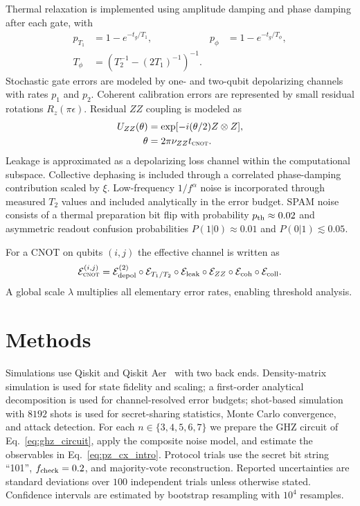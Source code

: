 \documentclass[aip,amsmath,amssymb,reprint,longbibliography]{revtex4-2}
\newcommand{\cnot}{\textsc{cnot}}
\newcommand{\cE}{\mathcal{E}}
\begin{document}
Thermal relaxation is implemented using amplitude damping and phase damping after each gate, with
\begin{equation}
\begin{aligned}
p_{T_1}&=1-e^{-t_g/T_1},&
p_\phi&=1-e^{-t_g/T_\phi},\\
T_\phi&=\left(T_2^{-1}-(2T_1)^{-1}\right)^{-1}.
\end{aligned}
\label{eq:t1t2_rates}
\end{equation}
Stochastic gate errors are modeled by one- and two-qubit depolarizing channels with rates $p_1$ and $p_2$.  Coherent calibration errors are represented by small residual rotations $R_z(\pi\epsilon)$.  Residual $ZZ$ coupling is modeled as
\begin{equation}
\begin{aligned}
U_{ZZ}(\theta)&=\exp[-i(\theta/2)Z\otimes Z],\\
\theta&=2\pi\nu_{ZZ}t_{\cnot}.
\end{aligned}
\label{eq:zz_noise}
\end{equation}
Leakage is approximated as a depolarizing loss channel within the computational subspace.  Collective dephasing is included through a correlated phase-damping contribution scaled by $\xi$.  Low-frequency $1/f^\alpha$ noise is incorporated through measured $T_2$ values and included analytically in the error budget.  SPAM noise consists of a thermal preparation bit flip with probability $p_{\rm th}\approx0.02$ and asymmetric readout confusion probabilities $P(1|0)\approx0.01$ and $P(0|1)\lesssim0.05$.

For a CNOT on qubits $(i,j)$ the effective channel is written as
\begin{equation}
\cE_{\cnot}^{(i,j)}=
\cE_{\rm depol}^{(2)}\circ
\cE_{T_1/T_2}\circ
\cE_{\rm leak}\circ
\cE_{ZZ}\circ
\cE_{\rm coh}\circ
\cE_{\rm coll}.
\label{eq:channel_composition}
\end{equation}
A global scale $\lambda$ multiplies all elementary error rates, enabling threshold analysis.

\section{Methods}
\label{sec:methods}

Simulations use Qiskit and Qiskit Aer~\cite{Qiskit2024,Aer2024} with two back ends.  Density-matrix simulation is used for state fidelity and scaling; a first-order analytical decomposition is used for channel-resolved error budgets; shot-based simulation with $8192$ shots is used for secret-sharing statistics, Monte Carlo convergence, and attack detection.  For each $n\in\{3,4,5,6,7\}$ we prepare the GHZ circuit of Eq.~\eqref{eq:ghz_circuit}, apply the composite noise model, and estimate the observables in Eq.~\eqref{eq:pz_cx_intro}.  Protocol trials use the secret bit string ``101'', $f_{\rm check}=0.2$, and majority-vote reconstruction.  Reported uncertainties are standard deviations over $100$ independent trials unless otherwise stated.  Confidence intervals are estimated by bootstrap resampling with $10^4$ resamples.
\end{document}
